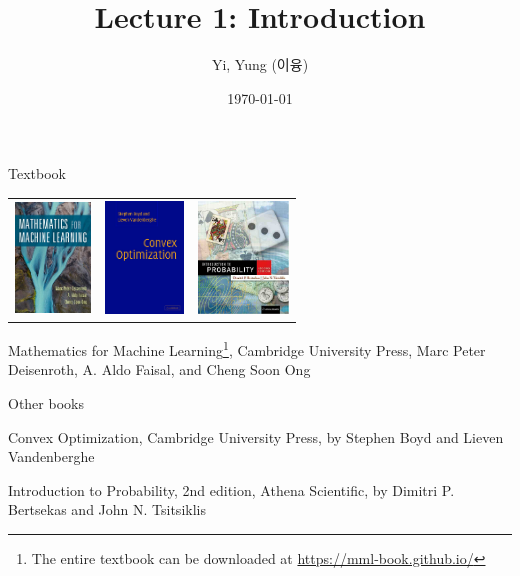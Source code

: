 \documentclass[handout,fleqn,aspectratio=169]{beamer}
\title[]{Lecture 1: Introduction}
\author{Yi, Yung (이융)}
\institute{Mathematics for Machine Learning\\ 
\url{https://yung-web.github.io/home/courses/mathml.html}
\\KAIST EE}
\date{\today}
\begin{document}


\begin{frame}{Textbook}

 \begin{center}
 \begin{tabular}{ccc}
 \includegraphics[width=2.0cm]{mathmlbook.png} & 
 \includegraphics[width=2.1cm]{cvxbook.png} &
 \includegraphics[width=2.4cm]{probcover-2nd.png} 
\end{tabular}
 \end{center}

\vspace{-0.4cm}
\plitemsep 0.02in

\bci 
\item Mathematics for Machine Learning\footnote{The entire textbook can be downloaded at \url{https://mml-book.github.io/}}, Cambridge University Press,   Marc Peter Deisenroth, A. Aldo Faisal, and Cheng Soon Ong
\item Other books
\bci
\item Convex Optimization, Cambridge University Press, by Stephen Boyd and Lieven Vandenberghe
\item Introduction to Probability, 2nd edition, Athena Scientific, by Dimitri P. Bertsekas and John N. Tsitsiklis
\eci
\eci

\end{frame}
\end{document}
